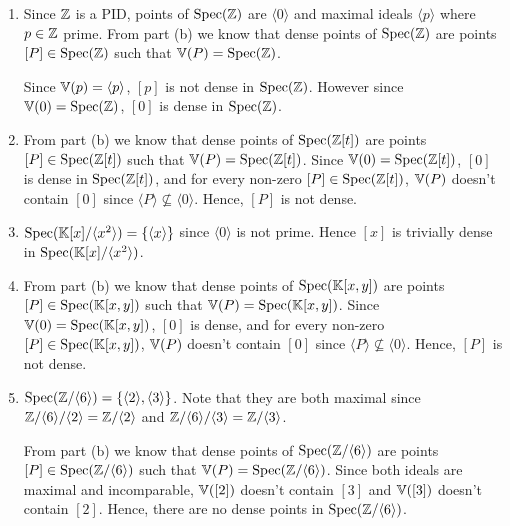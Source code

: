 \documentclass[Notebook.tex]{subfiles}
\begin{document}
\begin{solution}
\begin{enumerate}[label=(\alph*),ref=\theenumi\alph*]
\begin{enumerate}[label=(\roman*), ref=\theenumi\roman*]
            Since $\V(f) = \{\langle f \rangle\}$, $[f]$ is not dense in $\Spec(\K[x])$. However since $\V(0) = \Spec(\K[x])$, $[0]$ is dense in $\Spec(\K[x])$. 

            \item Since $\mathbb Z$ is a PID, points of $\operatorname{Spec}(\mathbb Z)$ are $\langle 0 \rangle$ and maximal ideals $\langle p \rangle$ where $p \in \mathbb Z$ prime. From part (b) we know that dense points of $\operatorname{Spec}(\mathbb Z)$ are points $[P] \in \operatorname{Spec}(\mathbb Z)$ such that $\mathbb V(P) = \operatorname{Spec}(\mathbb Z)$. 
            
            Since $\mathbb V(p) = \langle p \rangle$, $[p]$ is not dense in $\operatorname{Spec}(\mathbb Z)$. However since $\mathbb V(0) = \operatorname{Spec}(\mathbb Z)$, $[0]$ is dense in $\operatorname{Spec}(\mathbb Z)$. 

            \item From part (b) we know that dense points of $\operatorname{Spec}(\mathbb Z[t])$ are points $[P] \in \operatorname{Spec}(\mathbb Z[t])$ such that $\mathbb V(P) = \operatorname{Spec}(\mathbb Z[t])$. Since $\mathbb V(0) = \operatorname{Spec}(\mathbb Z[t])$, $[0]$ is dense in $\operatorname{Spec}(\mathbb Z[t])$, and for every non-zero $[P] \in \operatorname{Spec}(\mathbb Z[t])$, $\mathbb V(P)$ doesn't contain $[0]$ since $\langle P \rangle \not \subseteq \langle 0 \rangle$. Hence, $[P]$ is not dense. 
            
            \item $\operatorname{Spec}(\mathbb K[x]/\langle x^{2}\rangle) = \{\langle x \rangle\}$ since $\langle 0 \rangle$ is not prime. Hence $[x]$ is trivially dense in $\operatorname{Spec}(\mathbb K[x]/\langle x^{2}\rangle)$. 
            
            \item From part (b) we know that dense points of $\operatorname{Spec}(\mathbb K[x, y])$ are points $[P] \in \operatorname{Spec}(\mathbb K[x,y])$ such that $\mathbb V(P) = \operatorname{Spec}(\mathbb K[x,y])$. Since $\mathbb V(0) = \operatorname{Spec}(\mathbb K[x, y])$, $[0]$ is dense, and for every non-zero $[P] \in \operatorname{Spec}(\mathbb K[x,y])$, $\mathbb V(P)$ doesn't contain $[0]$ since $\langle P \rangle \not \subseteq \langle 0 \rangle$. Hence, $[P]$ is not dense. 

            \item $\operatorname{Spec}(\mathbb Z/\langle 6\rangle) = \{\langle 2 \rangle, \langle 3 \rangle\}$. Note that they are both maximal since $\mathbb Z/\langle 6\rangle/\langle 2 \rangle = \mathbb Z/\langle 2 \rangle$ and $\mathbb Z/\langle 6\rangle/\langle 3 \rangle = \mathbb Z/\langle 3 \rangle$. 
            
            From part (b) we know that dense points of $\operatorname{Spec}(\mathbb Z/\langle 6\rangle)$ are points $[P] \in \operatorname{Spec}(\mathbb Z/\langle 6\rangle)$ such that $\mathbb V(P) = \operatorname{Spec}(\mathbb Z/\langle 6\rangle)$. Since both ideals are maximal and incomparable, $\mathbb V([2])$ doesn't contain $[3]$ and $\mathbb V([3])$ doesn't contain $[2]$. Hence, there are no dense points in $\operatorname{Spec}(\mathbb Z/\langle 6\rangle)$. 


\end{enumerate}
\end{enumerate}
\end{solution}
\end{document}
